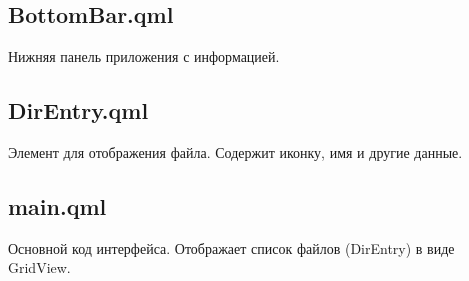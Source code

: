 \documentclass[a4paper,12pt]{article}
\begin{document}
\subsection{BottomBar.qml}
Нижняя панель приложения с информацией.
\subsection{DirEntry.qml}
Элемент для отображения файла. Содержит иконку, имя и другие данные.
\subsection{main.qml}
Основной код интерфейса. Отображает список файлов (DirEntry) в виде GridView.
\end{document}
